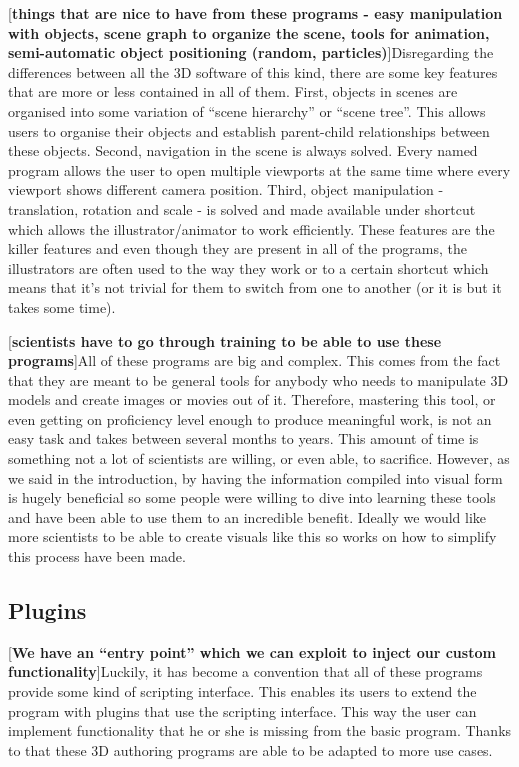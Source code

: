 \documentclass[
  digital, %
  table,   %
  nolof,     %
  nolot,     %
]{fithesis3}
\begin{document}
[\textbf{things that are nice to have from these programs - easy manipulation with objects, scene graph to organize the scene, tools for animation, semi-automatic object positioning (random, particles)}]Disregarding the differences between all the 3D software of this kind, there are some key features that are more or less contained in all of them. First, objects in scenes are organised into some variation of ``scene hierarchy'' or ``scene tree''. This allows users to organise their objects and establish parent-child relationships between these objects. Second, navigation in the scene is always solved. Every named program allows the user to open multiple viewports at the same time where every viewport shows different camera position. Third, object manipulation - translation, rotation and scale - is solved and made available under shortcut which allows the illustrator/animator to work efficiently.
These features are the killer features and even though they are present in all of the programs, the illustrators are often used to the way they work or to a certain shortcut which means that it's not trivial for them to switch from one to another (or it is but it takes some time).

[\textbf{scientists have to go through training to be able to use these programs}]All of these programs are big and complex. This comes from the fact that they are meant to be general tools for anybody who needs to manipulate 3D models and create images or movies out of it. Therefore, mastering this tool, or even getting on proficiency level enough to produce meaningful work, is not an easy task and takes between several months to years. This amount of time is something not a lot of scientists are willing, or even able, to sacrifice. However, as we said in the introduction, by having the information compiled into visual form is hugely beneficial so some people were willing to dive into learning these tools and have been able to use them to an incredible benefit. Ideally we would like more scientists to be able to create visuals like this so works on how to simplify this process have been made.

\subsection{Plugins}
[\textbf{We have an ``entry point'' which we can exploit to inject our custom functionality}]Luckily, it has become a convention that all of these programs provide some kind of scripting interface. This enables its users to extend the program with plugins that use the scripting interface. This way the user can implement functionality that he or she is missing from the basic program. Thanks to that these 3D authoring programs are able to be adapted to more use cases.
\end{document}
